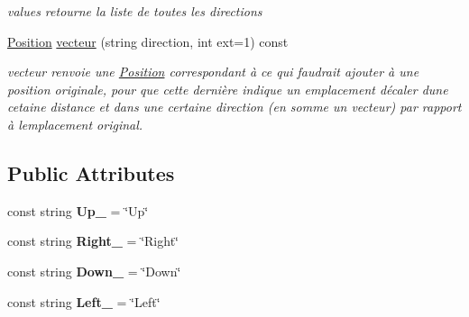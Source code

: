\begin{DoxyCompactItemize}
\begin{DoxyCompactList}\small\item\em values retourne la liste de toutes les directions \end{DoxyCompactList}\item 
\mbox{\hyperlink{class_position}{Position}} \mbox{\hyperlink{class_direction_a3be77e6a81164f95ebdef81001263d75}{vecteur}} (string direction, int ext=1) const
\begin{DoxyCompactList}\small\item\em vecteur renvoie une \mbox{\hyperlink{class_position}{Position}} correspondant à ce qui faudrait ajouter à une position originale, pour que cette dernière indique un emplacement décaler d\textquotesingle{}une cetaine distance et dans une certaine direction (en somme un vecteur) par rapport à l\textquotesingle{}emplacement original. \end{DoxyCompactList}\end{DoxyCompactItemize}
\subsection*{Public Attributes}
\begin{DoxyCompactItemize}
\item 
\mbox{\label{class_direction_a6736273d7e5a1b303c15c14dcc9ddf2d}} 
const string {\bfseries Up\+\_\+} = \char`\"{}Up\char`\"{}
\item 
\mbox{\label{class_direction_ae855fe40a6b5a1bb3f4293644b850ea9}} 
const string {\bfseries Right\+\_\+} = \char`\"{}Right\char`\"{}
\item 
\mbox{\label{class_direction_a78a7a733ceaf7ac62c1e76b3a30d26f6}} 
const string {\bfseries Down\+\_\+} = \char`\"{}Down\char`\"{}
\item 
\mbox{\label{class_direction_a57d13af88a9580d091d64ea1c9b0b993}} 
const string {\bfseries Left\+\_\+} = \char`\"{}Left\char`\"{}
\end{DoxyCompactItemize}
